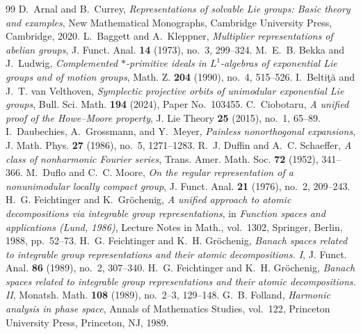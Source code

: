 \documentclass[10pt,a4paper]{amsart}
\numberwithin{equation}{section}
\begin{document}
\begin{thebibliography}{99}
 D.~Arnal and B.~Currey, \emph{Representations of solvable Lie groups: Basic theory and examples}, New Mathematical Monographs, Cambridge University Press, Cambridge, 2020.
 L.~Baggett and A.~Kleppner, \emph{Multiplier representations of abelian groups}, J. Funct. Anal. \textbf{14} (1973), no.~3, 299--324.
 M.~E.~B. Bekka and J.~Ludwig, \emph{Complemented $*$-primitive ideals in $L^1$-algebras of exponential Lie groups and of motion groups}, Math. Z. \textbf{204} (1990), no.~4, 515--526.
 I.~Belti\c{t}\u{a} and J.~T. van Velthoven, \emph{Symplectic projective orbits of unimodular exponential Lie groups}, Bull. Sci. Math. \textbf{194} (2024), Paper No.~103455.
 C.~Ciobotaru, \emph{A unified proof of the Howe--Moore property}, J. Lie Theory \textbf{25} (2015), no.~1, 65--89.
 I.~Daubechies, A.~Grossmann, and Y.~Meyer, \emph{Painless nonorthogonal expansions}, J. Math. Phys. \textbf{27} (1986), no.~5, 1271--1283.
 R.~J. Duffin and A.~C. Schaeffer, \emph{A class of nonharmonic Fourier series}, Trans. Amer. Math. Soc. \textbf{72} (1952), 341--366.
 M.~Duflo and C.~C. Moore, \emph{On the regular representation of a nonunimodular locally compact group}, J. Funct. Anal. \textbf{21} (1976), no.~2, 209--243.
 H.~G. Feichtinger and K.~Gr\"ochenig, \emph{A unified approach to atomic decompositions via integrable group representations}, in \emph{Function spaces and applications (Lund, 1986)}, Lecture Notes in Math., vol.~1302, Springer, Berlin, 1988, pp.~52--73.
 H.~G. Feichtinger and K.~H. Gr\"ochenig, \emph{Banach spaces related to integrable group representations and their atomic decompositions. I}, J. Funct. Anal. \textbf{86} (1989), no.~2, 307--340.
 H.~G. Feichtinger and K.~H. Gr\"ochenig, \emph{Banach spaces related to integrable group representations and their atomic decompositions. II}, Monatsh. Math. \textbf{108} (1989), no.~2--3, 129--148.
 G.~B. Folland, \emph{Harmonic analysis in phase space}, Annals of Mathematics Studies, vol.~122, Princeton University Press, Princeton, NJ, 1989.

\end{thebibliography}
\end{document}
